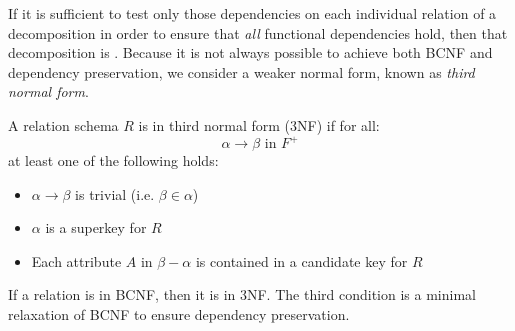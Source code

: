 \documentclass{article}
\begin{document}
If it is sufficient to test only those dependencies on each individual relation of a decomposition in order to ensure that \emph{all} functional dependencies hold, then that decomposition is . Because it is not always possible to achieve both BCNF and dependency preservation, we consider a weaker normal form, known as \emph{third normal form}. 

\begin{definition}
  A relation schema $R$ is in third normal form (3NF) if for all: $$\alpha \rightarrow \beta \textrm{ in } F^{+}$$ at least one of the following holds: 
  \begin{itemize}
    \item $\alpha \rightarrow \beta$ is trivial (i.e. $\beta \in \alpha$) 
    \item $\alpha$ is a superkey for $R$ 
    \item Each attribute $A$ in $\beta - \alpha$ is contained in a candidate key for $R$
  \end{itemize}
  If a relation is in BCNF, then it is in 3NF. The third condition is a minimal relaxation of BCNF to ensure dependency preservation. 
\end{definition}
\end{document}
